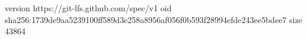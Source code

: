 version https://git-lfs.github.com/spec/v1
oid sha256:1739de9aa5239100ff589d3e258a8956af056f0b593f28994efde243ee5bdee7
size 43864
